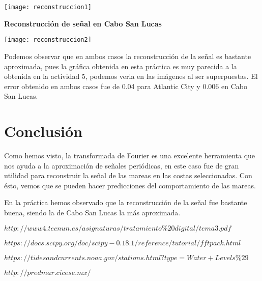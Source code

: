 \documentclass[12pt]{article}
\begin{document}
\begin{doublespace}
\begin{center}
\texttt{[image: reconstruccion1]}
\end{center}

\textbf{Reconstrucción de señal en Cabo San Lucas}

\begin{center}
\texttt{[image: reconstruccion2]}
\end{center}

Podemos observar que en ambos casos la reconstrucción de la señal es bastante aproximada, pues la gráfica obtenida en esta práctica es muy parecida a la obtenida en la actividad 5, podemos verla en las imágenes al ser superpuestas. El error obtenido en ambos casos fue de 0.04 para Atlantic City y 0.006 en Cabo San Lucas.

\section{Conclusión}
Como hemos visto, la transformada de Fourier es una excelente herramienta que nos ayuda a la aproximación de señales periódicas, en este caso fue de gran utilidad para reconstruir la señal de las mareas en las costas seleccionadas. Con ésto, vemos que se pueden hacer predicciones del comportamiento de las mareas. 

En la práctica hemos observado que la reconstrucción de la señal fue bastante buena, siendo la de Cabo San Lucas la más aproximada.

\newpage
\renewcommand{\refname}{\section{Referencias}}
\begin{thebibliography}{9}
 \textsc{$http://www4.tecnun.es/asignaturas/tratamiento\%20digital/tema3.pdf$}

 \textsc{$https://docs.scipy.org/doc/scipy-0.18.1/reference/tutorial/fftpack.html$}

 \textsc{$https://tidesandcurrents.noaa.gov/stations.html?type=Water+Levels\%29$}

 \textsc{$http://predmar.cicese.mx/$}
\end{thebibliography}


\end{doublespace}
\end{document}
